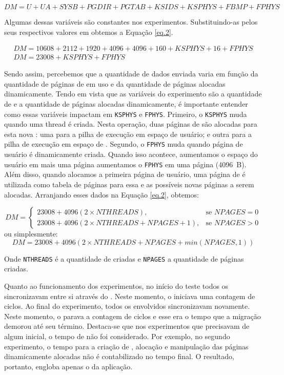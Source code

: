 \begin{equation}\label{eq.1}
    DM = U + UA + SYSB + PGDIR + PGTAB + KSIDS + KSPHYS + FBMP + FPHYS
\end{equation}

Algumas dessas variáveis são constantes nos experimentos. Substituindo-as pelos seus respectivos valores em \bytes obtemos a Equação \ref{eq.2}.

\begin{gather}
    DM = 10608 + 2112 + 1920 + 4096 + 4096 + 160 + KSPHYS + 16 + FPHYS\\
    DM = 23008 + KSPHYS + FPHYS\label{eq.2}
\end{gather}

Sendo assim, percebemos que a quantidade de dados enviada varia em função da quantidade de páginas de  em uso e da quantidade de páginas alocadas dinamicamente. Tendo em vista que as variáveis do experimento são a quantidade de \threads e a quantidade de páginas alocadas dinamicamente, é importante entender como essas variáveis impactam em \texttt{KSPHYS} e \texttt{FPHYS}. Primeiro, o \texttt{KSPHYS} muda quando uma thread é criada. Nesta operação, duas páginas de  são alocadas para esta nova \thread: uma para a pilha de execução em espaço de usuário; e outra para a pilha de execução em espaço de . Segundo, o \texttt{FPHYS} muda quando página de usuário é dinamicamente criada. Quando isso acontece, aumentamos o espaço do usuário em mais uma página \ie aumentamos o \texttt{FPHYS} em uma página (4096~B). Além disso, quando alocamos a primeira página de usuário, uma página de  é utilizada como tabela de páginas para essa e as possíveis novas páginas a serem alocadas. Arranjando esses dados na Equação \ref{eq.2}, obtemos:

\[
    DM = 
\begin{cases}
    23008 + 4096(2 \times NTHREADS),& \text{se } NPAGES= 0\\
    23008 + 4096(2 \times NTHREADS + NPAGES + 1),& \text{se } NPAGES > 0
\end{cases}
\]
ou simplesmente:
\begin{equation}\label{eq.3}
    DM = 23008 + 4096(2 \times NTHREADS + NPAGES + min(NPAGES, 1))
\end{equation}

Onde \texttt{NTHREADS} é a quantidade de \threads criadas e \texttt{NPAGES} a quantidade de páginas criadas.


Quanto ao funcionamento dos experimentos, no início do teste todos os \clusters sincronizavam entre si através do \sync. Neste momento, o \iocluster iniciava uma contagem de ciclos. Ao final do experimento, todos os \clusters envolvidos sincronizavam novamente. Neste momento, o \iocluster parava a contagem de ciclos e esse era o tempo que a migração demorou até seu término. Destaca-se que nos experimentos que precisavam de algum \setup inicial, o tempo de \setup não foi considerado. Por exemplo, no segundo experimento, o tempo para a criação de \threads, alocação e manipulação das páginas dinamicamente alocadas não é contabilizado no tempo final. O resultado, portanto, engloba apenas o \downtime da aplicação.



